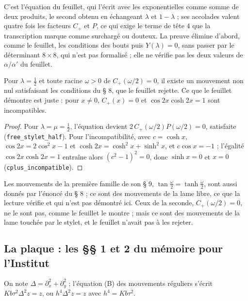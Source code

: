 \begin{remarque}
C'est l'équation du feuillet, qui l'écrit avec les exponentielles comme somme de deux produits, le second obtenu en échangeant $\lambda$ et $1-\lambda$ ; ses accolades valent quatre fois les facteurs $C_+$ et $P$, ce qui exige le terme de tête 4 que la transcription marque comme surchargé ou douteux. La preuve élimine d'abord, comme le feuillet, les conditions des bouts puis $Y(\lambda) = 0$, sans passer par le déterminant $8 \times 8$, qui n'est pas formalisé ; elle ne vérifie pas les deux valeurs de $\alpha/\alpha'$ du feuillet.
\end{remarque}

\begin{contrexemple}
Pour $\lambda = \frac12$ et toute racine $\omega > 0$ de $C_+(\omega/2) = 0$, il existe un mouvement non nul satisfaisant les conditions du § 8, que le feuillet rejette. Ce que le feuillet démontre est juste : pour $x \neq 0$, $C_+(x) = 0$ et $\cos 2x\cosh 2x = 1$ sont incompatibles.
\end{contrexemple}

\begin{proof}
Pour $\lambda = \mu = \frac12$, l'équation devient $2\,C_+(\omega/2)P(\omega/2) = 0$, satisfaite (\texttt{free\_stylet\_half}). Pour l'incompatibilité, avec $c = \cosh x$, $\cos 2x = 2\cos^2x - 1$ et $\cosh 2x = \cosh^2x + \sinh^2x$, et $c\cos x = -1$ ; l'égalité $\cos 2x\cosh 2x = 1$ entraîne alors $(c^2 - 1)^2 = 0$, donc $\sinh x = 0$ et $x = 0$ (\texttt{cplus\_incompatible}).
\end{proof}

\begin{remarque}
Les mouvements de la première famille de son § 9, $\tan\frac\omega2 = \tanh\frac\omega2$, sont aussi donnés par l'énoncé du § 8 ; ce sont des mouvements de la lame libre, ce que la lecture vérifie et qui n'est pas démontré ici. Ceux de la seconde, $C_+(\omega/2) = 0$, ne le sont pas, comme le feuillet le montre ; mais ce sont des mouvements de la lame touchée par le stylet, et le feuillet n'avait pas à les rejeter.
\end{remarque}

\subsection*{La plaque : les §§ 1 et 2 du mémoire pour l'Institut}

On note $\Delta = \partial_x^2 + \partial_y^2$ ; l'équation (B) des mouvements réguliers s'écrit $Kb\tau^2\Delta^2 z = z$, ou $h^4\Delta^2 z = z$ avec $h^4 = Kb\tau^2$.

